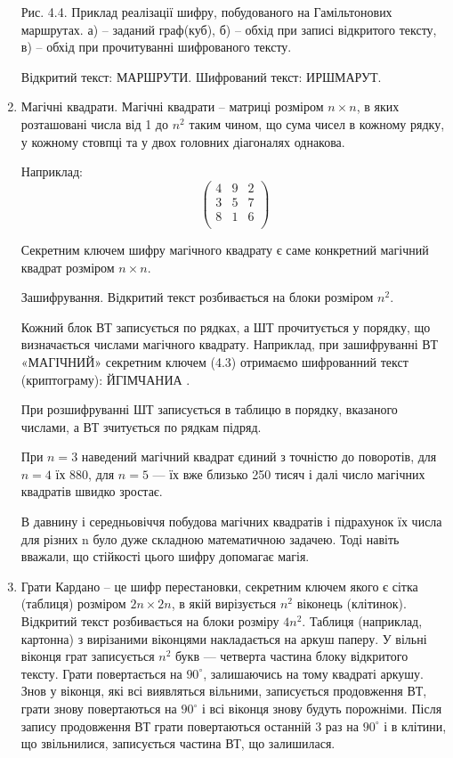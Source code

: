 \begin{enumerate}
    \beautifulImage
    Рис. 4.4. Приклад реалізації шифру, побудованого на Гамільтонових маршрутах.
    а) – заданий граф(куб), б) – обхід при записі відкритого тексту,
    в) – обхід при прочитуванні шифрованого тексту.
    
    Відкритий текст: МАРШРУТИ. Шифрований текст: ИРШМАРУТ.
    
    
    \item Магічні квадрати. Магічні квадрати – матриці розміром $n \times n$, в яких
    розташовані числа від 1 до $n^2$ таким чином, що сума чисел в кожному рядку,
    у кожному стовпці та у двох головних діагоналях однакова.
    
    Наприклад:
    \begin{equation}
        \begin{pmatrix}
            4 & 9 & 2 \\
            3 & 5 & 7 \\
            8 & 1 & 6 \\
        \end{pmatrix}
    \end{equation}
    
    Секретним ключем шифру магічного квадрату є саме конкретний магічний
    квадрат розміром $n \times n$.
    
    Зашифрування. Відкритий текст розбивається на блоки розміром $n^2$.
    
    Кожний блок ВТ записується по рядках, а ШТ прочитується у порядку, що
    визначається числами магічного квадрату. Наприклад, при зашифруванні
    ВТ «МАГІЧНИЙ» секретним ключем (4.3) отримаємо
    шифрованний текст (криптограму): ЙГІМЧАНИА .
    
    \beautifulImage
    
    При розшифруванні ШТ записується в таблицю в
    порядку, вказаного числами, а ВТ зчитується по рядкам
    підряд.
    
    При $n = 3$ наведений магічний квадрат єдиний з точністю до поворотів,
    для $n = 4$ їх 880, для $n = 5$ --- їх вже близько 250 тисяч і далі число магічних
    квадратів швидко зростає.
    
    В давнину і середньовіччя побудова магічних квадратів і підрахунок їх
    числа для різних n було дуже складною математичною задачею. Тоді навіть
    вважали, що стійкості цього шифру допомагає магія.
    
    \item Грати Кардано – це шифр перестановки, секретним ключем якого є сітка
    (таблиця) розміром $2n \times 2n$, в якій вирізується $n^2$ віконець (клітинок).
    Відкритий текст розбивається на блоки розміру $4n^2$. Таблиця (наприклад,
    картонна) з вирізаними віконцями накладається на аркуш паперу. У вільні
    віконця грат записується $n^2$ букв --- четверта частина блоку відкритого
    тексту. Грати повертається на $90^{\circ}$, залишаючись на тому квадраті аркушу.
    Знов у віконця, які всі виявляться вільними, записується продовження ВТ,
    грати знову повертаються на $90^{\circ}$ і всі віконця знову будуть порожніми.
    Після запису продовження ВТ грати повертаються останній 3 раз на $90^{\circ}$ і в
    клітини, що звільнилися, записується частина ВТ, що залишилася.
    

\end{enumerate}
